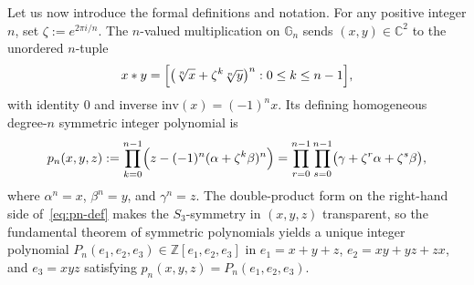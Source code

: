 \documentclass[10pt]{article}
\numberwithin{equation}{section}
\theoremstyle{plain}
\theoremstyle{definition}
\newcommand{\C}{\mathbb{C}}
\newcommand{\Z}{\mathbb{Z}}
\newcommand{\G}{\mathbb{G}}
\newcommand{\1}{\mathbf{1}}
\begin{document}
Let us now introduce the formal definitions and notation. For any positive integer $n$, set $\zeta := e^{2\pi i/n}$. The $n$-valued multiplication on $\G_n$ sends $(x, y) \in \C^2$ to the unordered $n$-tuple
\[
x * y = \Bigl[\bigl(\sqrt[n]{x} + \zeta^k \sqrt[n]{y}\bigr)^n : 0 \le k \le n - 1\Bigr],
\]
with identity $0$ and inverse $\mathrm{inv}(x) = (-1)^n x$. Its defining homogeneous degree-$n$ symmetric integer polynomial is
\begin{equation}\label{eq:pn-def}
p_n(x, y, z) := \prod_{k=0}^{n-1}\Bigl(z - (-1)^n(\alpha + \zeta^k \beta)^n\Bigr)
= \prod_{r=0}^{n-1}\prod_{s=0}^{n-1}\bigl(\gamma + \zeta^r \alpha + \zeta^s \beta\bigr),
\end{equation}
where $\alpha^n = x$, $\beta^n = y$, and $\gamma^n = z$. The double-product form on the right-hand side of~\eqref{eq:pn-def} makes the $S_3$-symmetry in $(x, y, z)$ transparent, so the fundamental theorem of symmetric polynomials yields a unique integer polynomial $P_n(e_1, e_2, e_3) \in \Z[e_1, e_2, e_3]$ in $e_1 = x + y + z$, $e_2 = xy + yz + zx$, and $e_3 = xyz$ satisfying $p_n(x, y, z) = P_n(e_1, e_2, e_3)$.
\end{document}
